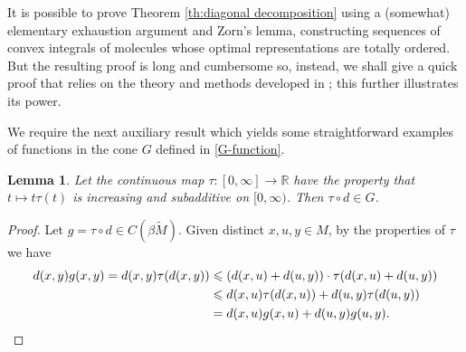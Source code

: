 \documentclass[a4paper,10pt]{amsart}
\newcommand{\RR}{\mathbb{R}}                                %
\newcommand{\wt}[1]{\widetilde{#1}}                         %
\newcommand{\bwt}[1]{\beta\wt{#1}}                          %
\renewcommand{\leq}{\leqslant}
\theoremstyle{plain}
\newtheorem{lemma}[theorem]{Lemma}
\theoremstyle{definition}
\theoremstyle{remark}
\begin{document}
It is possible to prove Theorem \ref{th:diagonal decomposition} using a (somewhat) elementary exhaustion argument and Zorn's lemma, constructing sequences of convex integrals of molecules whose optimal representations are totally ordered. But the resulting proof is long and cumbersome so, instead, we shall give a quick proof that relies on the theory and methods developed in \cite{Smith24}; this further illustrates its power.

We require the next auxiliary result which yields some straightforward examples of functions in the cone $G$ defined in \eqref{G-function}.

\begin{lemma}\label{lm:inc_subadd}
Let the continuous map $\tau:[0,\infty]\to\RR$ have the property that $t \mapsto t\tau(t)$ is increasing and subadditive on $[0,\infty)$. Then $\tau \circ d \in G$.
\end{lemma}

\begin{proof}
Let $g=\tau \circ d \in C(\bwt{M})$. Given distinct $x,u,y \in M$, by the properties of $\tau$ we have
\begin{align*}
d(x,y)g(x,y) = d(x,y)\tau(d(x,y)) &\leq (d(x,u)+d(u,y))\cdot\tau(d(x,u)+d(u,y)) \\
&\leq d(x,u)\tau(d(x,u)) + d(u,y)\tau(d(u,y)) \\
&= d(x,u)g(x,u) + d(u,y)g(u,y). \qedhere
\end{align*}
\end{proof}
\end{document}
